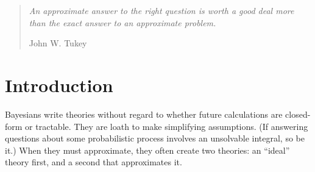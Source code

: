 \begin{comment}
TODO LIST

* Use := for definitions and ::= for grammars

\end{comment}



\begin{quote}
\textit{An approximate answer to the right question is worth a good deal more than the exact answer to an approximate problem.}

\hfill John W. Tukey
\end{quote}

\begin{comment}
\begin{abstract}
Bayesian practitioners build models of the world without regarding how difficult it will be to answer questions about them. When answering questions, they put off approximating as long as possible, and usually must write programs to compute converging approximations. Writing the programs is distracting, tedious and error-prone, and we wish to relieve them of it by providing languages and compilers.

Their style constrains our work: the tools we provide cannot approximate early. Our approach to meeting this constraint is to 1) determine their notation's meaning in a suitable theoretical framework; 2) generalize our interpretation in an uncomputable, \textit{exact} semantics; 3) \textit{approximate} the exact semantics and prove convergence; and 4) implement the approximating semantics in Racket (formerly PLT Scheme). In this way, we define languages with at least as much exactness as Bayesian practitioners have in mind, and also put off approximating as long as possible.

In this paper, we demonstrate the approach using our preliminary work on discrete (countably infinite) Bayesian models.

\keywords{Semantics, Domain-specific languages, Probability theory}
\end{abstract}
\end{comment}

\section{Introduction}

Bayesians write theories without regard to whether future calculations are closed-form or tractable. They are loath to make simplifying assumptions.
(If answering questions about some probabilistic process involves an unsolvable integral, so be it.)
When they must approximate, they often create two theories: an ``ideal'' theory first, and a second that approximates it.


